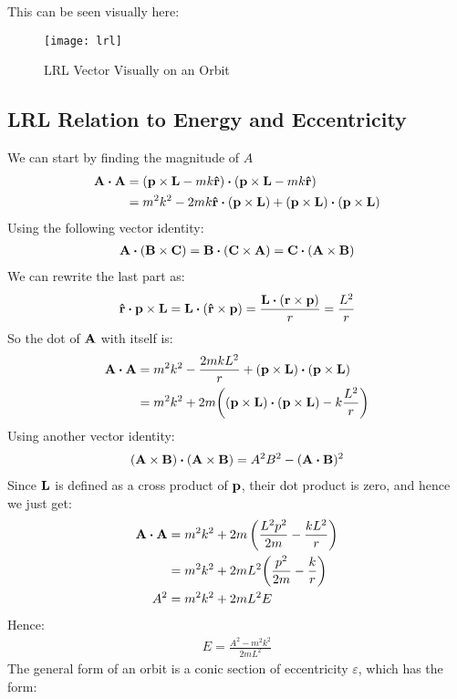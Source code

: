 \documentclass[12pt]{article}
\theoremstyle{plain}
\theoremstyle{definition}
\newcommand{\veps}{\varepsilon}
\begin{document}
This can be seen visually here:
\begin{figure}[H]
  \centering
  \texttt{[image: lrl]}
  \caption{LRL Vector Visually on an Orbit}
\end{figure}
\subsection{LRL Relation to Energy and Eccentricity}
We can start by finding the magnitude of $A$
\begin{align*}
  \vb{A}\vdot\vb{A}&=
  \qty(\vb{p}\times\vb{L}-mk\vu{r})\vdot\qty(\vb{p}\times\vb{L}-mk\vu{r})\\
  &=m^2k^2-2mk \vu{r}\vdot(\vb{p}\times\vb{L})
  +(\vb{p}\times\vb{L})\vdot(\vb{p}\times\vb{L})
\end{align*}
Using the following vector identity:
\begin{align*}
  \vb{A}\vdot(\vb{B}\times\vb{C})
  =\vb{B}\vdot(\vb{C}\times\vb{A})
  =\vb{C}\vdot(\vb{A}\times\vb{B})
\end{align*}
We can rewrite the last part as:
\begin{align*}
  \vu{r}\vdot\vb{p}\times\vb{L}
  =\vb{L}\vdot(\vu{r}\times\vb{p})
  =\frac{\vb{L}\vdot(\vb{r}\times \vb{p})}{r}=\frac{L^2}{r}
\end{align*}
So the dot of $\vb{A}$ with itself is:
\begin{align*}
  \vb{A\vdot A}&=m^2k^2-\frac{2mkL^2}{r}
  +(\vb{p}\times\vb{L})\vdot(\vb{p}\times\vb{L})\\
  &=m^2k^2+2m\qty(
  (\vb{p\times L})\vdot(\vb{p\times L})-k\frac{L^2}{r})\\
\end{align*}
Using another vector identity:
\begin{align*}
  (\vb{A\times B})\vdot(\vb{A\times B})=A^2 B^2-(\vb{A\vdot B})^2
\end{align*}
Since $\vb{L}$ is defined as a cross product of $\vb{p}$, their dot product is zero, and hence we just get:
\begin{align*}
  \vb{A\vdot A}&=m^2k^2+2 m\left(\frac{L^2 p^2}{2 m}-\frac{k L^2}{r}\right)\\
  &=m^2k^2+2mL^2\qty(\frac{p^2}{2m}-\frac{k}{r})\\
  A^2&=m^2k^2+2mL^2E
\end{align*}
Hence:
\begin{align*}
  E=\frac{A^2-m^2k^2}{2mL^2}
\end{align*}
The general form of an orbit is a conic section of eccentricity $\veps$, which has the form:
\end{document}

